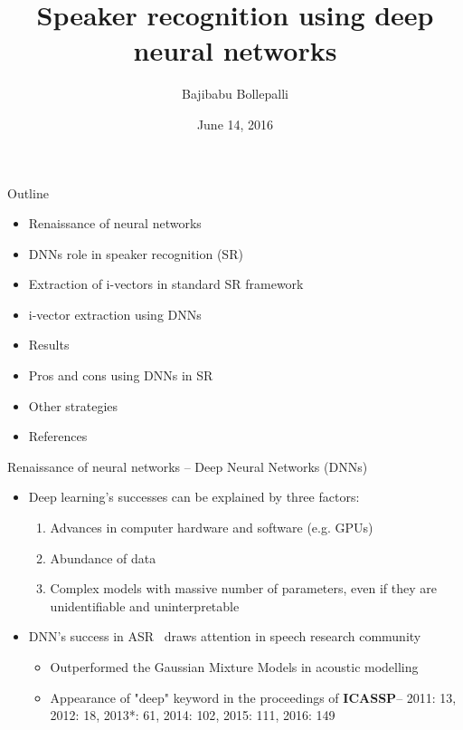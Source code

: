 \documentclass{beamer}
\title{Speaker recognition using deep neural networks}
\author{Bajibabu Bollepalli}
\institute[Aalto University] %
{
  Department of Signal Processing and Acoustics\\
  Aalto University
  }
\date{June 14, 2016}
\begin{document}
\begin{frame}
  \titlepage
\end{frame}

\begin{frame}{Outline}
  \begin{itemize}
      \item{Renaissance of neural networks}
      \item{DNNs role in speaker recognition (SR)}
      \item{Extraction of i-vectors in standard SR framework}
      \item{i-vector extraction using DNNs}
      \item{Results}
      \item{Pros and cons using DNNs in SR}
      \item{Other strategies}
      \item{References}
  \end{itemize}
\end{frame}

\begin{frame}{Renaissance of neural networks -- Deep Neural Networks (DNNs)}
\begin{itemize}
    \item{ Deep learning's successes can be explained by three factors:
  \begin{enumerate}
      \item Advances in computer hardware and software (e.g. GPUs)
      \item Abundance of data
      \item Complex models with massive number of parameters, even if they are unidentifiable and uninterpretable
  \end{enumerate}}
  
  \item
  DNN's success in ASR~\cite{Hinton2012} draws attention in speech research community
  \begin{itemize}
     \item{Outperformed the Gaussian Mixture Models in acoustic modelling}
      \item { Appearance of "deep" keyword in the proceedings of \textbf{ICASSP}-- 2011: \alert{13}, 2012: \alert{18}, 2013*: \alert{61}, 2014: 
      \alert{102}, 2015: \alert{111}, 2016: \alert{149}}
  \end{itemize}
\end{itemize}
\end{frame}
\end{document}
